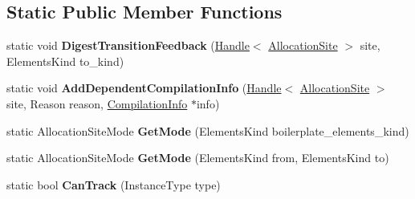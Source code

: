 \subsection*{Static Public Member Functions}
\begin{DoxyCompactItemize}
\item 
\hypertarget{classv8_1_1internal_1_1_allocation_site_a0bfecad8387c5d8ce19551d9ec7326ce}{}static void {\bfseries Digest\+Transition\+Feedback} (\hyperlink{classv8_1_1internal_1_1_handle}{Handle}$<$ \hyperlink{classv8_1_1internal_1_1_allocation_site}{Allocation\+Site} $>$ site, Elements\+Kind to\+\_\+kind)\label{classv8_1_1internal_1_1_allocation_site_a0bfecad8387c5d8ce19551d9ec7326ce}

\item 
\hypertarget{classv8_1_1internal_1_1_allocation_site_a8d34a33c5cc89177a9c6959578487dc9}{}static void {\bfseries Add\+Dependent\+Compilation\+Info} (\hyperlink{classv8_1_1internal_1_1_handle}{Handle}$<$ \hyperlink{classv8_1_1internal_1_1_allocation_site}{Allocation\+Site} $>$ site, Reason reason, \hyperlink{classv8_1_1internal_1_1_compilation_info}{Compilation\+Info} $\ast$info)\label{classv8_1_1internal_1_1_allocation_site_a8d34a33c5cc89177a9c6959578487dc9}

\item 
\hypertarget{classv8_1_1internal_1_1_allocation_site_a6ac30d18f89c9a43eaff3ca894671851}{}static Allocation\+Site\+Mode {\bfseries Get\+Mode} (Elements\+Kind boilerplate\+\_\+elements\+\_\+kind)\label{classv8_1_1internal_1_1_allocation_site_a6ac30d18f89c9a43eaff3ca894671851}

\item 
\hypertarget{classv8_1_1internal_1_1_allocation_site_a4c5f330f48db33d18eaa5346fd89130c}{}static Allocation\+Site\+Mode {\bfseries Get\+Mode} (Elements\+Kind from, Elements\+Kind to)\label{classv8_1_1internal_1_1_allocation_site_a4c5f330f48db33d18eaa5346fd89130c}

\item 
\hypertarget{classv8_1_1internal_1_1_allocation_site_a5bce0a6a275e0f9a9c8a3e87babab0d9}{}static bool {\bfseries Can\+Track} (Instance\+Type type)\label{classv8_1_1internal_1_1_allocation_site_a5bce0a6a275e0f9a9c8a3e87babab0d9}

\end{DoxyCompactItemize}
